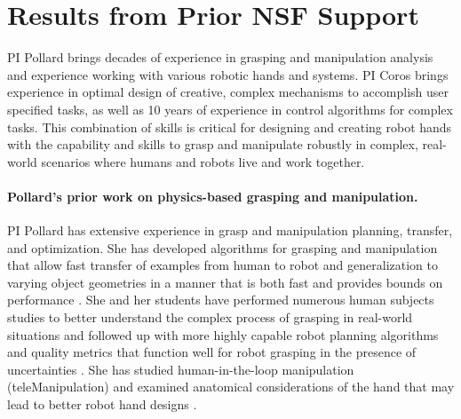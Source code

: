 \section{Results from Prior NSF Support}

PI Pollard brings decades of experience in grasping and manipulation analysis and experience working with various robotic hands and systems.   PI Coros brings experience in optimal design of creative, complex mechanisms to accomplish user specified tasks, as well as 10 years of experience in control algorithms for complex tasks.     This combination of skills is critical for designing and creating robot hands with the capability and skills to grasp and manipulate robustly in complex, real-world scenarios where humans and robots live and work together.

\paragraph{Pollard's prior work on physics-based grasping and manipulation.} 
PI Pollard has extensive experience in grasp and manipulation planning, transfer, and optimization.   She has developed algorithms for grasping and manipulation that allow fast transfer of examples from human to robot and generalization to varying object geometries in a manner that is both fast and provides bounds on performance \cite{pollard2004closure,Pollard:WAFR02,pollard2005physically,Li:graspDB07}.   She and her students have performed numerous human subjects studies to better understand the complex process of grasping in real-world situations \cite{Chang:2009,Chang:JMB10,illing2014changing,liu2016annotating} and followed up with more highly capable robot planning algorithms and quality metrics that function well for robot grasping in the presence of uncertainties \cite{Chang:ICRA10,Kappler:2012,kim2013physically}.   She has studied human-in-the-loop manipulation (teleManipulation) \cite{Toh:2012,chung2015quadratic,Kim:CGA11} and examined anatomical considerations of the hand that may lead to better robot hand designs \cite{pollard2002tendon,fu2006importance,Chang:twoAxis08,Chang:CoR06,Chang:AoR06}.


